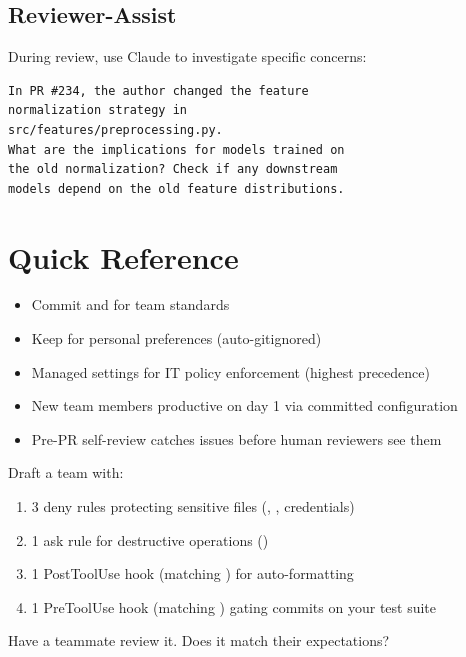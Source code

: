 \subsection{Reviewer-Assist}

During review, use Claude to investigate specific concerns:

\begin{verbatim}
In PR #234, the author changed the feature
normalization strategy in
src/features/preprocessing.py.
What are the implications for models trained on
the old normalization? Check if any downstream
models depend on the old feature distributions.
\end{verbatim}


\section{Quick Reference}

\begin{itemize}
  \item Commit  and  for team standards
  \item Keep  for personal preferences (auto-gitignored)
  \item Managed settings for IT policy enforcement (highest precedence)
  \item New team members productive on day 1 via committed configuration
  \item Pre-PR self-review catches issues before human reviewers see them
\end{itemize}

\begin{trybox}
Draft a team  with:
\begin{enumerate}
  \item 3 deny rules protecting sensitive files (, , credentials)
  \item 1 ask rule for destructive operations ()
  \item 1 PostToolUse hook (matching ) for auto-formatting
  \item 1 PreToolUse hook (matching ) gating commits on your test suite
\end{enumerate}
Have a teammate review it. Does it match their expectations?
\end{trybox}
